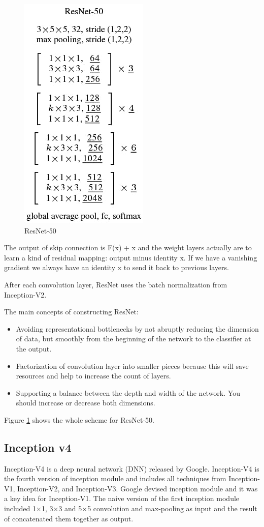 \documentclass[titlepage]{report}
\begin{document}
\begin{figure}
\centering
\includegraphics[scale=0.6]{resnet_2}
\caption{ResNet-50}
\label{fig:resnet_50}
\end{figure}

The output of skip connection is  F(x) + x and the weight layers actually are to learn a kind of residual mapping: output minus identity x. If we have a vanishing gradient we always have an identity x to send it back to previous layers. 

After each convolution layer, ResNet uses the batch normalization from Inception-V2. 

The main concepts of constructing ResNet:
\begin{itemize}
\item Avoiding representational bottlenecks by not abruptly reducing the dimension of data, but smoothly from the beginning of the network to the classifier at the output.
\item Factorization of convolution layer into smaller pieces because this will save resources and help to increase the count of layers.
\item Supporting a balance between the depth and width of the network. You should increase or decrease both dimensions.
\end{itemize}

Figure \ref{fig:resnet_50} shows the whole scheme for ResNet-50.

\subsection{Inception v4}
Inception-V4 is a deep neural network (DNN) released by Google. Inception-V4 is the fourth version of inception module and includes all techniques from Inception-V1, Inception-V2, and Inception-V3. Google devised inception module and it was a key idea for Inception-V1. The naive version of the first inception module included 1×1, 3×3 and 5×5 convolution and max-pooling as input and the result of concatenated them together as output. \\
\end{document}
